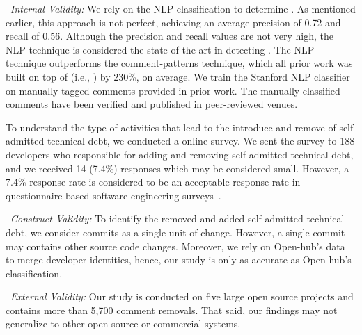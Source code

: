 

\noindent~\emph{\textit{Internal Validity:}}  We rely on the NLP classification to determine \SATD. As mentioned earlier, this approach is not perfect, achieving an average precision of 0.72 and recall of 0.56. Although the precision and recall values are not very high, the NLP technique is considered the state-of-the-art in detecting \SATD. The NLP technique outperforms the comment-patterns technique, which all prior work was built on top of (i.e., \cite{Wehaibi2016SANER,Bavota2016MSR,Potdar2014ICSME}) by 230\%, on average. We train the Stanford NLP classifier on manually tagged \SATD comments provided in prior work. The manually classified comments have been verified and published in peer-reviewed venues. 

To understand the type of activities that lead to the introduce and remove of self-admitted technical debt, we conducted a online survey. We sent the survey to 188 developers who responsible for adding and removing self-admitted technical debt, and we received 14 (7.4\%) responses which may be considered small. However, a 7.4\% response rate is considered to be an acceptable response rate in questionnaire-based software engineering surveys~\cite{singer2008software}.

\noindent~\emph{\textit{Construct Validity:}} 
To identify the removed and added self-admitted technical debt, we consider commits as a single unit of change. However, a single commit may contains other source code changes. Moreover, we rely on Open-hub's data to merge developer identities, hence, our study is only as accurate as Open-hub's classification.

\noindent~\emph{\textit{External Validity:}}  Our study is conducted on five large open source projects and contains more than 5,700 comment removals. That said, our findings may not generalize to other open source or commercial systems.